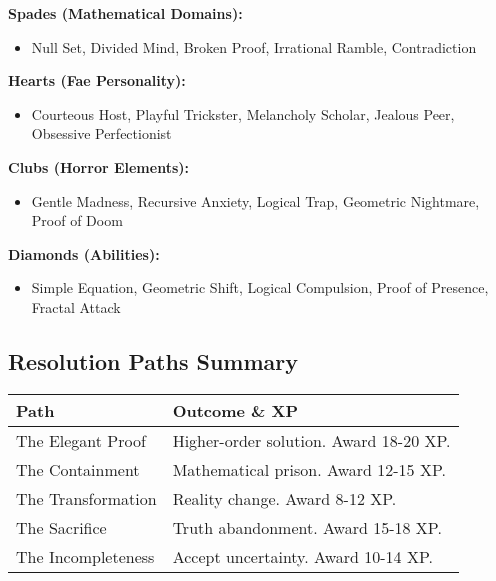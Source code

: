 \documentclass[11pt]{article}
\begin{document}
\textbf{Spades (Mathematical Domains):}
\begin{itemize}
\item Null Set, Divided Mind, Broken Proof, Irrational Ramble, Contradiction
\end{itemize}

\textbf{Hearts (Fae Personality):}
\begin{itemize}
\item Courteous Host, Playful Trickster, Melancholy Scholar, Jealous Peer, Obsessive Perfectionist
\end{itemize}

\textbf{Clubs (Horror Elements):}
\begin{itemize}
\item Gentle Madness, Recursive Anxiety, Logical Trap, Geometric Nightmare, Proof of Doom
\end{itemize}

\textbf{Diamonds (Abilities):}
\begin{itemize}
\item Simple Equation, Geometric Shift, Logical Compulsion, Proof of Presence, Fractal Attack
\end{itemize}

\subsection*{Resolution Paths Summary}

\begin{tabular}{|p{4cm}|p{8cm}|}
\hline
\rowcolor{tableheader}
\textbf{Path} & \textbf{Outcome \& XP} \\
\hline
The Elegant Proof & Higher-order solution. Award 18-20 XP. \\
The Containment & Mathematical prison. Award 12-15 XP. \\
The Transformation & Reality change. Award 8-12 XP. \\
The Sacrifice & Truth abandonment. Award 15-18 XP. \\
The Incompleteness & Accept uncertainty. Award 10-14 XP. \\
\hline
\end{tabular}
\end{document}

